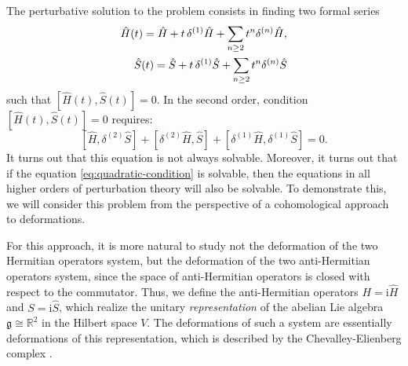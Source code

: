 \documentclass[10pt,a4paper]{amsart}
\theoremstyle{definition}
\begin{document}
The perturbative solution to the problem consists in finding two formal series
    \begin{eqnarray}
            \notag
            \hat{H}(t)=\hat{H}+t\,\delta^{(1)}\hat{H}+\sum_{n\geq 2}t^{n}\delta^{(n)}\hat{H},\\
            \hat{S}(t)=\hat{S}+t\,\delta^{(1)}\hat{S}+\sum_{n\geq 2}t^{n}\delta^{(n)}\hat{S}
    \end{eqnarray}
    such that $[\hat{H}(t),\hat{S}(t)]=0$.
 In the second order, condition $[\hat{H}(t),\hat{S}(t)]=0$ requires:
    \begin{equation} \label{eq:quadratic-condition}
        [\hat{H},\delta^{(2)}\hat{S}]+[\delta^{(2)}\hat{H},\hat{S}]+[\delta^{(1)}\hat{H},\delta^{(1)}\hat{S}]=0.
    \end{equation}
    It turns out that this equation is not always solvable. Moreover, it turns out that if the equation \eqref{eq:quadratic-condition} is solvable, then the equations in all higher orders of perturbation theory will also be solvable. To demonstrate this, we will consider this problem from the perspective of a cohomological approach to deformations.

    For this approach, it is more natural to study not the deformation of the two Hermitian operators system, but the deformation of the two anti-Hermitian operators system, since the space of anti-Hermitian operators is closed with respect to the commutator. Thus, we define the anti-Hermitian operators $H=\mathrm{i}\hat{H}$ and $S=\mathrm{i}\hat{S}$, which realize the unitary \emph{representation} of the abelian Lie algebra $\mathfrak{g}\cong \mathbb{R}^{2}$ in the Hilbert space $V$. The deformations of such a system are essentially deformations of this representation, which is described by the Chevalley-Elienberg complex \cite{Chevalley:1948}.
\end{document}
